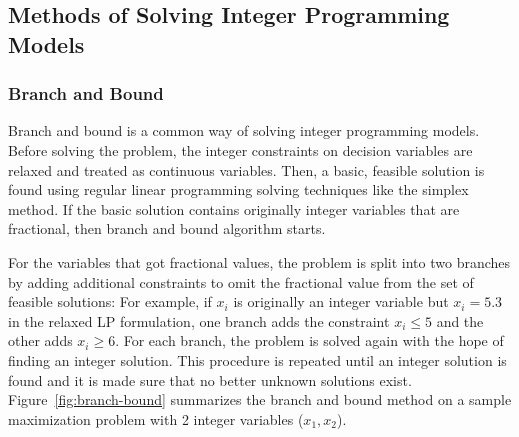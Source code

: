 \documentclass[a4paper,12pt]{report}
\begin{document}
\subsection{Methods of Solving Integer Programming Models}

\subsubsection{Branch and Bound}

Branch and bound is a common way of solving integer programming models. Before solving the problem, the integer constraints on decision variables are relaxed and treated as continuous variables. Then, a basic, feasible solution is found using regular linear programming solving techniques like the simplex method. If the basic solution contains originally integer variables that are fractional, then branch and bound algorithm starts.

For the variables that got fractional values, the problem is split into two branches by adding additional constraints to omit the fractional value from the set of feasible solutions: For example, if \( x_i \) is originally an integer variable but  \( x_i =5.3 \) in the relaxed LP formulation, one branch adds the constraint \( x_i \le 5 \) and the other adds \( x_i \ge 6 \). For each branch, the problem is solved again with the hope of finding an integer solution. This procedure is repeated until an integer solution is found and it is made sure that no better unknown solutions exist.~\cite{branch-bound} Figure~\ref{fig:branch-bound} summarizes the branch and bound method on a sample maximization problem with 2 integer variables (\( x_1, x_2 \)).
\end{document}
